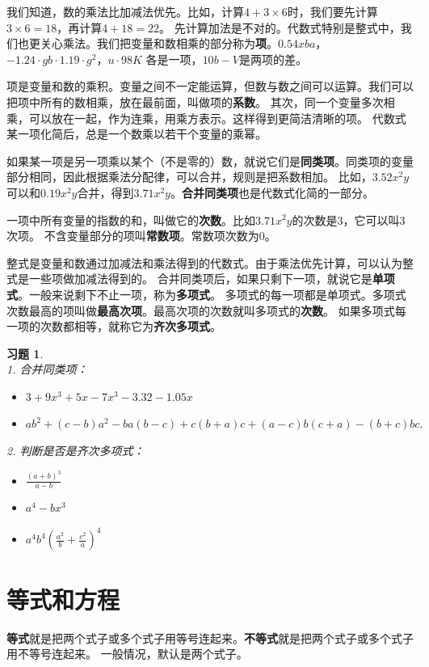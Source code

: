 \documentclass[12pt,UTF8]{ctexbook}
\newtheorem{xt}{习题}[section]
\begin{document}
我们知道，数的乘法比加减法优先。比如，计算$4 + 3\times 6$时，我们要先计算$3\times 6 = 18$，再计算$4 + 18 = 22$。
先计算加法是不对的。代数式特别是整式中，我们也更关心乘法。我们把变量和数相乘的部分称为\textbf{项}。$0.54xba$，$-1.24\cdot gb\cdot 1.19 \cdot g^2$，$u\cdot 98K$
各是一项，$10b - V$是两项的差。

项是变量和数的乘积。变量之间不一定能运算，但数与数之间可以运算。我们可以把项中所有的数相乘，放在最前面，叫做项的\textbf{系数}。
其次，同一个变量多次相乘，可以放在一起，作为连乘，用乘方表示。这样得到更简洁清晰的项。
代数式某一项化简后，总是一个数乘以若干个变量的乘幂。

如果某一项是另一项乘以某个（不是零的）数，就说它们是\textbf{同类项}。同类项的变量部分相同，因此根据乘法分配律，可以合并，规则是把系数相加。
比如，$3.52x^2y$可以和$0.19x^2y$合并，得到$3.71x^2y$。\textbf{合并同类项}也是代数式化简的一部分。

一项中所有变量的指数的和，叫做它的\textbf{次数}。比如$3.71x^2y$的次数是$3$，它可以叫$3$次项。
不含变量部分的项叫\textbf{常数项}。常数项次数为$0$。

整式是变量和数通过加减法和乘法得到的代数式。由于乘法优先计算，可以认为整式是一些项做加减法得到的。
合并同类项后，如果只剩下一项，就说它是\textbf{单项式}。一般来说剩下不止一项，称为\textbf{多项式}。
多项式的每一项都是单项式。多项式次数最高的项叫做\textbf{最高次项}。最高次项的次数就叫多项式的\textbf{次数}。
如果多项式每一项的次数都相等，就称它为\textbf{齐次多项式}。
\begin{xt}\label{xt:1-0-0}
    \mbox{} \\
    1. 合并同类项：\begin{itemize}
        \item $3 + 9x^3 + 5x - 7x^3 - 3.32 - 1.05x$
        \item $ab^2 + (c-b)a^2 - ba(b - c) + c(b + a)c + (a - c)b(c + a) - (b + c)bc.$
    \end{itemize}
    2. 判断是否是齐次多项式：\begin{itemize}
        \item $\frac{(a+b)^3}{a - b}$
        \item $a^4 - bx^3$
        \item $a^4b^4\left(\frac{a^2}{b} + \frac{c^2}{a}\right)^4$
    \end{itemize}
\end{xt}

\section{等式和方程}
\textbf{等式}就是把两个式子或多个式子用等号连起来。\textbf{不等式}就是把两个式子或多个式子用不等号连起来。
一般情况，默认是两个式子。
\end{document}
